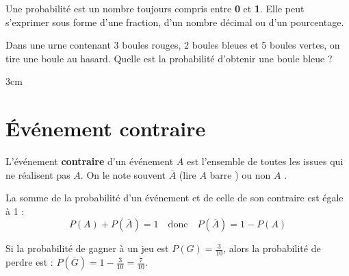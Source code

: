 \documentclass[a4paper]{book}
\begin{document}
    
    \begin{remarque}
        Une probabilité est un nombre toujours compris entre \textbf{0} et \textbf{1}. Elle peut s'exprimer sous forme d'une fraction, d'un nombre décimal ou d'un pourcentage.
    \end{remarque}

    
    \begin{methode}
        Dans une urne contenant 3 boules rouges, 2 boules bleues et 5 boules vertes, on tire une boule au hasard. Quelle est la probabilité d'obtenir une boule bleue ?
        \begin{ZoneReponse}{3cm}
        \end{ZoneReponse}
    \end{methode}
    
    
\section{Événement contraire}
    
    \begin{definition}
        L'événement \textbf{contraire} d'un événement $A$ est l'ensemble de toutes les issues qui ne réalisent pas $A$. On le note souvent $\overline{A}$ (lire \og $A$ barre \fg) ou \og non $A$ \fg.
    \end{definition}

    
    \begin{propriete}
        La somme de la probabilité d'un événement et de celle de son contraire est égale à 1 :
        \[ P(A) + P(\overline{A}) = 1 \quad \text{donc} \quad P(\overline{A}) = 1 - P(A) \]
    \end{propriete}

    
    \begin{exemple}
        Si la probabilité de gagner à un jeu est $P(G) = \frac{3}{10}$, alors la probabilité de perdre est :
        $P(\overline{G}) = 1 - \frac{3}{10} = \frac{7}{10}$.
    \end{exemple}
\end{document}
